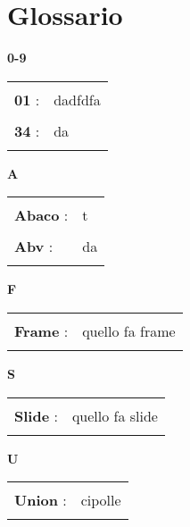 \section{Glossario}{ 
\hfill\Huge{\textbf{0-9}} \\ 
\normalsize 
\begin{longtabu} to  
\toprule \\ 
\textbf{01} : & dadfdfa \\ 
 \\ 
\textbf{34} : & da \\ 
 \\ 
\end{longtabu} 
\newpage 
\hfill\Huge{\textbf{A}} \\ 
\normalsize 
\begin{longtabu} to  
\toprule \\ 
\textbf{Abaco} : & t \\ 
 \\ 
\textbf{Abv} : & da \\ 
 \\ 
\end{longtabu} 
\newpage 
\hfill\Huge{\textbf{F}} \\ 
\normalsize 
\begin{longtabu} to  
\toprule \\ 
\textbf{Frame} : & quello fa frame \\ 
 \\ 
\end{longtabu} 
\newpage 
\hfill\Huge{\textbf{S}} \\ 
\normalsize 
\begin{longtabu} to  
\toprule \\ 
\textbf{Slide} : & quello fa slide \\ 
 \\ 
\end{longtabu} 
\newpage 
\hfill\Huge{\textbf{U}} \\ 
\normalsize 
\begin{longtabu} to  
\toprule \\ 
\textbf{Union} : & cipolle \\ 
 \\ 
\end{longtabu} 
 }